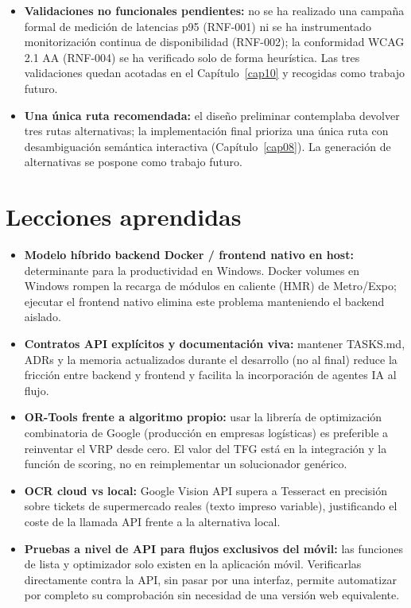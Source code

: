 \begin{itemize}
  \item \textbf{Validaciones no funcionales pendientes:} no se ha realizado una campa\~na formal
    de medici\'on de latencias p95 (RNF-001) ni se ha instrumentado monitorizaci\'on continua de
    disponibilidad (RNF-002); la conformidad WCAG 2.1 AA (RNF-004) se ha verificado solo de forma
    heur\'istica. Las tres validaciones quedan acotadas en el Cap\'itulo~\ref{cap10} y recogidas
    como trabajo futuro.

  \item \textbf{Una \'unica ruta recomendada:} el dise\~no preliminar contemplaba devolver tres
    rutas alternativas; la implementaci\'on final prioriza una \'unica ruta con desambiguaci\'on
    sem\'antica interactiva (Cap\'itulo~\ref{cap08}). La generaci\'on de alternativas se pospone
    como trabajo futuro.
\end{itemize}

\section{Lecciones aprendidas}\label{sec:lecciones}

\begin{itemize}
  \item \textbf{Modelo h\'ibrido backend Docker / frontend nativo en host:} determinante para la
    productividad en Windows. Docker volumes en Windows rompen la recarga de m\'odulos en caliente
    (HMR) de Metro/Expo; ejecutar el frontend nativo elimina este problema manteniendo el backend
    aislado.

  \item \textbf{Contratos API expl\'icitos y documentaci\'on viva:} mantener TASKS.md, ADRs y la
    memoria actualizados durante el desarrollo (no al final) reduce la fricci\'on entre backend y
    frontend y facilita la incorporaci\'on de agentes IA al flujo.

  \item \textbf{OR-Tools frente a algoritmo propio:} usar la librer\'ia de optimizaci\'on
    combinatoria de Google (producci\'on en empresas log\'isticas) es preferible a reinventar el
    VRP desde cero. El valor del TFG est\'a en la integraci\'on y la funci\'on de scoring, no en
    reimplementar un solucionador gen\'erico.

  \item \textbf{OCR cloud vs local:} Google Vision API supera a Tesseract en precisi\'on sobre
    tickets de supermercado reales (texto impreso variable), justificando el coste de la llamada
    API frente a la alternativa local.

  \item \textbf{Pruebas a nivel de API para flujos exclusivos del m\'ovil:} las funciones de lista
    y optimizador solo existen en la aplicaci\'on m\'ovil. Verificarlas directamente contra la API,
    sin pasar por una interfaz, permite automatizar por completo su comprobaci\'on sin necesidad de
    una versi\'on web equivalente.
\end{itemize}

